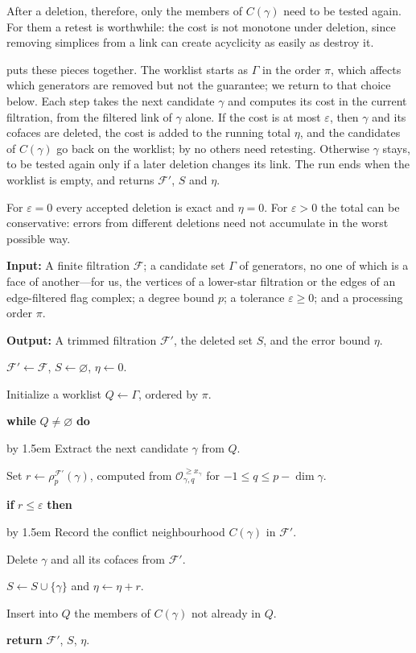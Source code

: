 \documentclass[11pt,letterpaper]{article}
\newenvironment{algorithm}[1][tb]{%
  \begin{algofloat}[#1]\centering
  \begin{minipage}{0.94\linewidth}\small
}{%
  \end{minipage}
  \end{algofloat}
}
\newcommand{\KwIn}[1]{\par\noindent\textbf{Input:} #1\par}
\newcommand{\KwOut}[1]{\par\noindent\textbf{Output:} #1\par}
\newcommand{\While}[2]{%
  \par\noindent\textbf{while }#1\textbf{ do}\par
  \begingroup\advance\leftskip by 1.5em #2\par\endgroup
}
\newcommand{\If}[2]{%
  \par\noindent\textbf{if }#1\textbf{ then}\par
  \begingroup\advance\leftskip by 1.5em #2\par\endgroup
}
\newcommand{\Return}[1]{\par\noindent\textbf{return }#1\par}
\theoremstyle{definition}
\newcommand{\Oc}{\mathcal O}
\newcommand{\eps}{\varepsilon}
\begin{document}
After a deletion, therefore, only the members of $C(\gamma)$ need to be tested
again. For them a retest is worthwhile: the cost is not monotone under
deletion, since removing simplices from a link can create acyclicity as easily
as destroy it.

 puts these pieces together. The worklist starts as
$\Gamma$ in the order $\pi$, which affects which generators are removed but not
the guarantee; we return to that choice below. Each step takes the next
candidate $\gamma$ and computes its cost in the current filtration, from the
filtered link of $\gamma$ alone. If the cost is at most $\eps$, then $\gamma$
and its cofaces are deleted, the cost is added to the running total $\eta$, and
the candidates of $C(\gamma)$ go back on the worklist; by 
no others need retesting. Otherwise $\gamma$ stays, to be tested again only if
a later deletion changes its link. The run ends when the worklist is empty, and
returns $\mathcal F'$, $S$ and $\eta$.

For $\eps=0$ every accepted deletion is exact and $\eta=0$. For $\eps>0$ the
total can be conservative: errors from different deletions need not accumulate
in the worst possible way.

\begin{algorithm}[ht]
\caption{\textsc{HomTrim}}
\label{alg:future-trim}
\KwIn{A finite filtration $\mathcal F$; a candidate set $\Gamma$ of generators,
no one of which is a face of another---for us, the vertices of a lower-star
filtration or the edges of an edge-filtered flag complex; a degree bound $p$; a
tolerance $\eps\geq0$; and a processing order $\pi$.}
\KwOut{A trimmed filtration $\mathcal F'$, the deleted set $S$, and the error
bound $\eta$.}
$\mathcal F'\gets\mathcal F$, $S\gets\varnothing$, $\eta\gets0$.\par
Initialize a worklist $Q\gets\Gamma$, ordered by $\pi$.\par
\While{$Q\neq\varnothing$}{
  Extract the next candidate $\gamma$ from $Q$.\par
  Set $r\gets\rho_p^{\mathcal F'}(\gamma)$, computed from
  $\Oc_{\gamma,q}^{\geq x_\gamma}$ for
  $-1\leq q\leq p-\dim\gamma$.\par
  \If{$r\leq\eps$}{
    Record the conflict neighbourhood $C(\gamma)$ in $\mathcal F'$.\par
    Delete $\gamma$ and all its cofaces from $\mathcal F'$.\par
    $S\gets S\cup\{\gamma\}$ and
    $\eta\gets\eta+r$.\par
    Insert into $Q$ the members of $C(\gamma)$ not already in $Q$.\par
  }
}
\Return{$\mathcal F'$, $S$, $\eta$.}
\end{algorithm}
\end{document}
